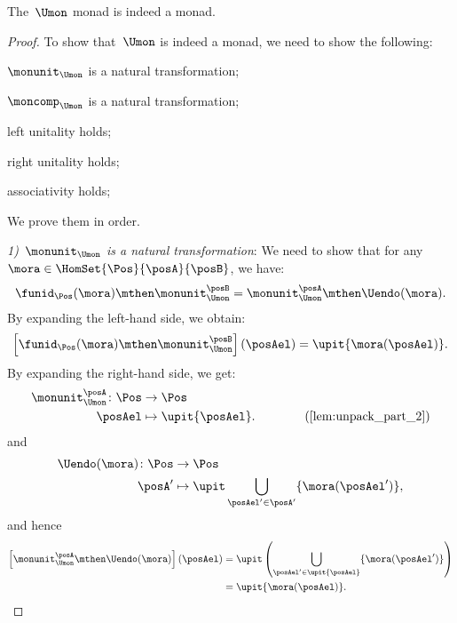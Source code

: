 \begin{lemma}
  The~$\Umon$ monad is indeed a monad.
\end{lemma}
\begin{proof}
  To show that~$\Umon$ is indeed a monad, we need to show the following:
  \begin{compactenum}
    \item $\monunit_{\Umon}$ is a natural transformation;
    \item $\moncomp_{\Umon}$ is a natural transformation;
    \item left unitality holds;
    \item right unitality holds;
    \item associativity holds;
  \end{compactenum}
  We prove them in order.

  \emph{1)~$\monunit_{\Umon}$ is a natural transformation}: We need to show that for any~$\mora\in \HomSet{\Pos}{\posA}{\posB}$, we have:
  \begin{equation}
    \funid_{\Pos}(\mora)\mthen \monunit_{\Umon}^\posB=\monunit_{\Umon}^\posA\mthen \Uendo(\mora).
  \end{equation}
  By expanding the left-hand side, we obtain:
  \begin{equation}
    \left[\funid_{\Pos}(\mora)\mthen \monunit_{\Umon}^\posB\right](\posAel)=\upit \{\mora(\posAel)\}.
  \end{equation}
  By expanding the right-hand side, we get:
  \begin{equation}
    \begin{aligned}
      \monunit_{\Umon}^\posA\colon \Pos &\to \Pos\\
      \posAel&\mapsto \upit \{\posAel\}. \qquad \qquad (\cref{lem:unpack_part_2})
    \end{aligned}
  \end{equation}
  and
  \begin{equation}
    \begin{aligned}
      \Uendo(\mora)\colon \Pos &\to \Pos\\
      \posA'&\mapsto \upit \bigcup_{\posAel'\in \posA'}\{\mora(\posAel')\},
    \end{aligned}
  \end{equation}
  and hence
  \begin{equation}
    \begin{aligned}
      \left[\monunit_{\Umon}^\posA\mthen \Uendo(\mora)\right](\posAel)&=\upit \left( \bigcup_{\posAel'\in \upit \{\posAel\}} \{\mora(\posAel')\}\right)\\
      &=\upit \{\mora(\posAel)\}.
    \end{aligned}
  \end{equation}


\end{proof}
